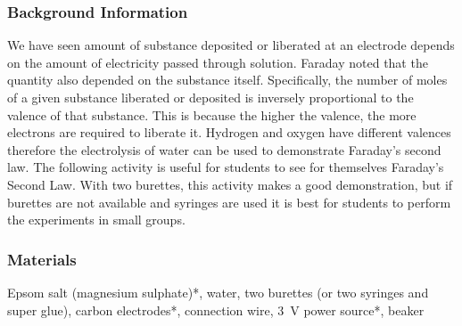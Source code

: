 \subsubsection*{Background Information}
We have seen amount of substance deposited or liberated at an electrode depends on the amount of electricity passed through solution. Faraday noted that the quantity also depended on the substance itself. Specifically, the number of moles of a given substance liberated or deposited is inversely proportional to the valence of that substance. This is because the higher the valence, the more electrons are required to liberate it. Hydrogen and oxygen have different valences therefore the electrolysis of water can be used to demonstrate Faraday's second law. 
The following activity is useful for students to see for themselves Faraday's Second Law. With two burettes, this activity makes a good demonstration, but if burettes are not available and syringes are used it is best for students to perform the experiments in small groups.

\subsubsection*{Materials}
Epsom salt (magnesium sulphate)*, water, two burettes (or two syringes and super glue), carbon electrodes*, connection wire, 3~V power source*, beaker

